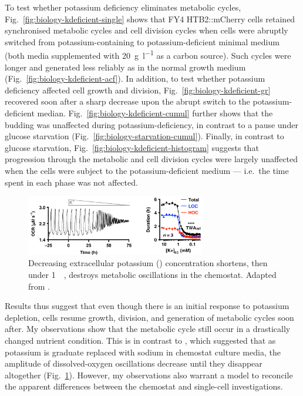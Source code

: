 To test whether potassium deficiency eliminates metabolic cycles, Fig.\ \ref{fig:biology-kdeficient-single} shows that FY4 HTB2::mCherry cells retained synchronised metabolic cycles and cell division cycles when cells were abruptly switched from potassium-containing to potassium-deficient minimal medium (both media supplemented with \SI{20}{\gram~\litre^{-1}} as a carbon source).
Such cycles were longer and generated less reliably as in the normal growth medium (Fig.\ \ref{fig:biology-kdeficient-acf}).
In addition, to test whether potassium deficiency affected cell growth and division, Fig.\ \ref{fig:biology-kdeficient-gr} recovered soon after a sharp decrease upon the abrupt switch to the potassium-deficient median.
Fig.\ \ref{fig:biology-kdeficient-cumul} further shows that the budding was unaffected during potassium-deficiency, in contrast to a pause under glucose starvation (Fig.\ \ref{fig:biology-starvation-cumul}).
Finally, in contrast to glucose starvation, Fig.\ \ref{fig:biology-kdeficient-histogram} suggests that progression through the metabolic and cell division cycles were largely unaffected when the cells were subject to the potassium-deficient medium --- i.e.\ the time spent in each phase was not affected.


\begin{figure}
  \centering
  \includegraphics[width=0.7\textwidth]{oneillEukaryoticCellBiology2020_4_adapted.png}
  \caption{
    Decreasing extracellular potassium () concentration shortens, then under \SI{1}{\milli\molar}, destroys metabolic oscillations in the chemostat.
    Adapted from \textcite{oneillEukaryoticCellBiology2020}.
  }
  \label{fig:biology-kdeficient-oneill}
\end{figure}

Results thus suggest that even though there is an initial response to potassium depletion, cells resume growth, division, and generation of metabolic cycles soon after.
My observations show that the metabolic cycle still occur in a drastically changed nutrient condition.
This is in contrast to \textcite{oneillEukaryoticCellBiology2020}, which suggested that as potassium is graduate replaced with sodium in chemostat culture media, the amplitude of dissolved-oxygen oscillations decrease until they disappear altogether (Fig.\ \ref{fig:biology-kdeficient-oneill}).
However, my observations also warrant a model to reconcile the apparent differences between the chemostat and single-cell investigations.


